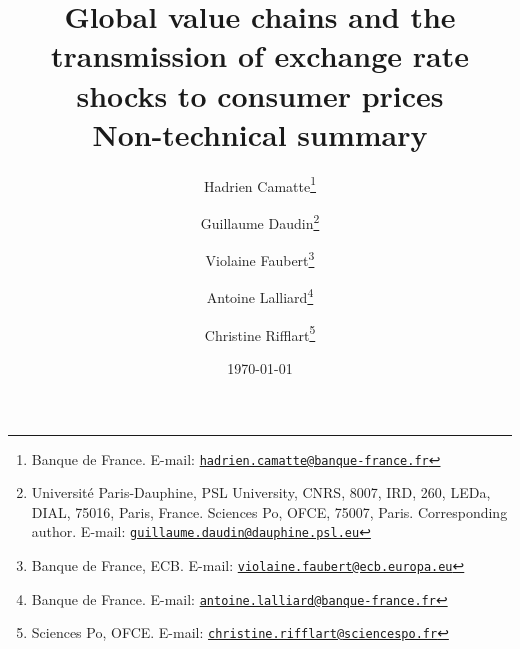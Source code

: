 \documentclass[12pt,a4paper]{article}
\newcommand{\email}[1]{\href{mailto:#1}{\nolinkurl{#1}}}
\begin{document}
\title{Global value chains and the transmission of exchange rate shocks to consumer prices \\ Non-technical summary
\vspace{1cm}
}
\vspace{1cm}
\date{\today}
\author{
	Hadrien Camatte\thanks{Banque de France. E-mail: \email{hadrien.camatte@banque-france.fr}}
	\and
	Guillaume Daudin\thanks{Université Paris-Dauphine, PSL University, CNRS, 8007, IRD, 260, LEDa, DIAL, 75016, Paris, France. Sciences Po, OFCE, 75007, Paris. Corresponding author. E-mail: \email{guillaume.daudin@dauphine.psl.eu}}
	\and
	Violaine Faubert\thanks{Banque de France, ECB. E-mail: \email{violaine.faubert@ecb.europa.eu}}
	\and
	Antoine Lalliard\thanks{Banque de France. E-mail: \email{antoine.lalliard@banque-france.fr}}
	\and
	Christine Rifflart\thanks{Sciences Po, OFCE. E-mail: \email{christine.rifflart@sciencespo.fr}}
}
\maketitle
\end{document}

